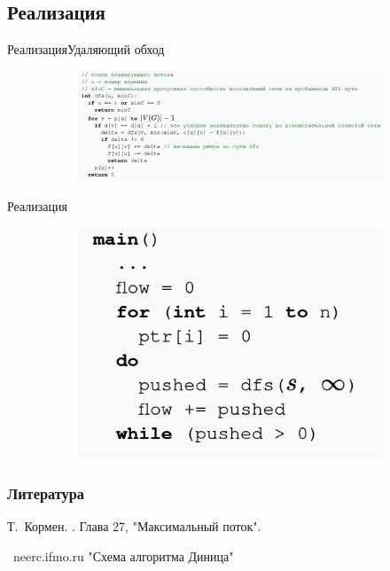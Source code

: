 \documentclass{beamer}
\begin{document}
\subsection{Реализация}
\begin{frame}{Реализация}{Удаляющий обход}
\begin{figure}
    \begin{figure}[h!]
        \centering
        \includegraphics[scale=0.5]{dfs.png}
        \label{fig:dfs}
    \end{figure}
\end{figure}
\end{frame}

\begin{frame}{Реализация}
\begin{figure}
    \begin{figure}[h!]
        \centering
        \includegraphics[scale=0.8]{main.png}
        \label{fig:dfs}
    \end{figure}
\end{figure}
\end{frame}

\begin{frame}[allowframebreaks]
  \frametitle<presentation>{Литература}

  \begin{thebibliography}{10}

  \beamertemplatebookbibitems

    Т.~Кормен.
    .
    \newblock Глава 27, "Максимальный поток".


  \beamertemplatearticlebibitems

  \bibitem{}
      ~neerc.ifmo.ru
      \newblock "Схема алгоритма Диница"
  \end{thebibliography}
\end{frame}
\end{document}
